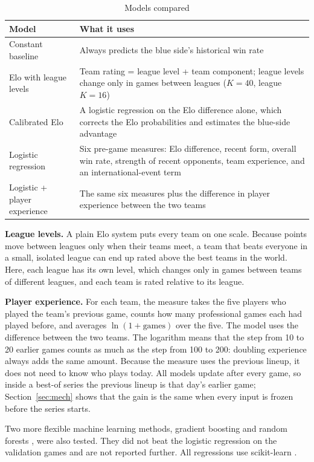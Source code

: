\documentclass[12pt,a4paper]{article}
\begin{document}
\begin{table}[H]
\centering\small
\caption{Models compared}\label{tab:models}
\begin{tabularx}{\linewidth}{@{}>{\raggedright\arraybackslash}p{4.3cm}Y@{}}
\toprule
Model & What it uses \\
\midrule
Constant baseline & Always predicts the blue side's historical win rate \\
Elo with league levels & Team rating = league level + team component; league levels change only in games between leagues ($K = 40$, league $K = 16$) \\
Calibrated Elo & A logistic regression on the Elo difference alone, which corrects the Elo probabilities and estimates the blue-side advantage \\
Logistic regression & Six pre-game measures: Elo difference, recent form, overall win rate, strength of recent opponents, team experience, and an international-event term \\
Logistic + player experience & The same six measures plus the difference in player experience between the two teams \\
\bottomrule
\end{tabularx}
\end{table}

\textbf{League levels.} A plain Elo system puts every team on one scale. Because points move between leagues only when their teams meet, a team that beats everyone in a small, isolated league can end up rated above the best teams in the world. Here, each league has its own level, which changes only in games between teams of different leagues, and each team is rated relative to its league.

\textbf{Player experience.} For each team, the measure takes the five players who played the team's previous game, counts how many professional games each had played before, and averages $\ln(1 + \text{games})$ over the five. The model uses the difference between the two teams. The logarithm means that the step from 10 to 20 earlier games counts as much as the step from 100 to 200: doubling experience always adds the same amount. Because the measure uses the previous lineup, it does not need to know who plays today. All models update after every game, so inside a best-of series the previous lineup is that day's earlier game; Section~\ref{sec:mech} shows that the gain is the same when every input is frozen before the series starts.

Two more flexible machine learning methods, gradient boosting \citep{friedman2001} and random forests \citep{breiman2001}, were also tested. They did not beat the logistic regression on the validation games and are not reported further. All regressions use scikit-learn \citep{pedregosa2011}.
\end{document}
